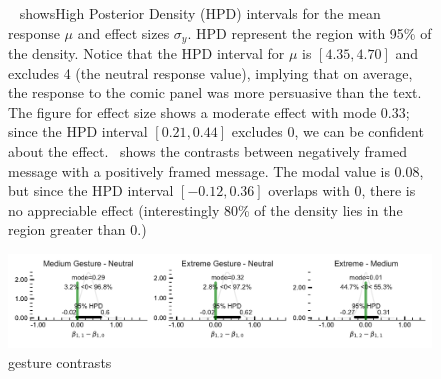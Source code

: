 \begin{figure}
  \hfill
 \caption{~ showsHigh Posterior Density (HPD) intervals for the mean response $\mu$ and effect sizes $\sigma_y$. HPD represent the region with 95\% of the density. Notice that the HPD interval for $\mu$ is $[4.35, 4.70]$ and excludes 4 (the neutral response value), implying that on average, the response to the comic panel was more persuasive than the text. The figure for effect size shows a moderate effect with mode $0.33$; since the HPD interval $[0.21, 0.44]$ excludes 0, we can be confident about the effect.~ shows the contrasts between negatively framed message with a positively framed message. The modal value is $0.08$, but since the HPD interval $[-0.12, 0.36]$ overlaps with 0, there is no appreciable effect (interestingly 80\% of the density lies in the region greater than 0.)}
 \label{fig:main-experiment-effect}
\end{figure}

\begin{figure}
 \includegraphics[width=\textwidth]{./hari-code/factors_gesture_contrasts_main-noint.pdf}
 \caption{gesture contrasts}
 \label{fig:gesture-contrasts-main}
\end{figure}


